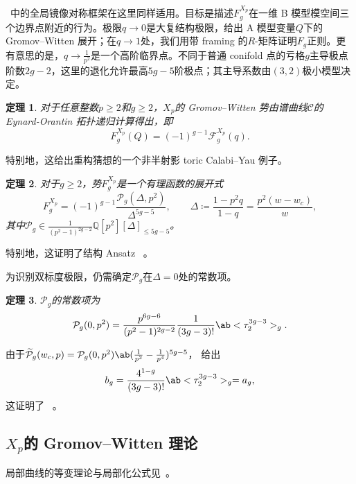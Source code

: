 \documentclass{amsart}
\newtheorem{thm}{定理}[section]
\theoremstyle{definition}
\theoremstyle{remark}
\theoremstyle{plain}
\theoremstyle{definition}
\theoremstyle{remark}
\newcommand{\Q}{\mathbb{Q}}
\newcommand{\mc}[1]{\mathcal{#1}}
\newcommand{\wt}[1]{\widetilde{#1}}
\newcommand{\1}{\mathbf{1}}
\newcommand{\2}{\mathbf{2}}
\newcommand{\3}{\mathbf{3}}
\begin{document}
~中的全局镜像对称框架在这里同样适用。目标是描述\(F_g^{X_p}\)在一维 B 模型模空间三个边界点附近的行为。极限\(q \to 0\)是大复结构极限，给出 A 模型变量\(Q\)下的 Gromov--Witten 展开；在\(q \to 1\)处，我们用带 framing 的\(R\)-矩阵证明\(F_g\)正则。更有意思的是，\(q \to \frac{1}{p^2}\)是一个高阶临界点。不同于普通 conifold 点的亏格\(g\)主导极点阶数\(2g-2\)，这里的退化允许最高\(5g-5\)阶极点；其主导系数由\((3,2)\)极小模型决定。

\begin{thm}%
\label{thm:local P1 mirror symmetry}
对于任意整数\(p \geq 2\)和\(g \geq 2\)，\(X_p\)的 Gromov--Witten 势由谱曲线\(\mc{C}\)的 Eynard-Orantin 拓扑递归计算得出，即
    \[ F_g^{X_p}(Q) = (-1)^{g-1}\mc{F}_g^{X_p}(q). \]
\end{thm}

特别地，这给出重构猜想的一个非半射影 toric Calabi--Yau 例子。

\begin{thm}%
\label{thm:local P1 rationality}
    对于\(g \geq 2\)，势\(F_g^{X_p}\)是一个有理函数的展开式
    \[ F_g^{X_p} = (-1)^{g-1}\frac{\mc{P}_g(\Delta,p^2)}{\Delta^{5g-5}}, \qquad \Delta \coloneqq \frac{1-p^2q}{1-q} = \frac{p^2(w-w_c)}{w}, \]
    其中\(\mc{P}_g \in \frac{1}{(p^2-1)^{2g-2}}\Q[p^2][\Delta]_{\leq 5g-5}\)。
\end{thm}

特别地，这证明了结构 Ansatz ~。

为识别双标度极限，仍需确定\(\mc{P}_g\)在\(\Delta = 0\)处的常数项。

\begin{thm}%
\label{thm:local P1 constant term}
    \(\mc{P}_g\)的常数项为
    \[ \mc{P}_g(0,p^2) = \frac{p^{6g-6}}{(p^2-1)^{2g-2}}\frac{1}{(3g-3)!}\ab<\tau_2^{3g-3}>_g. \]
\end{thm}

由于\(\wt{\mc{P}}_g(w_c,p) = \mc{P}_g(0,p^2)\ab(\frac{1}{p^2}-\frac{1}{p^4})^{5g-5}\)， 给出
\[ b_g = \frac{4^{1-g}}{(3g-3)!}\ab<\tau_2^{3g-3}>_g = a_g, \]
这证明了 ~。

\subsection{\(X_p\)的 Gromov--Witten 理论}%
\label{sub:Gromov-Witten theory of Xp}

局部曲线的等变理论与局部化公式见~\cite{BryanPandharipande2008}。
\end{document}
